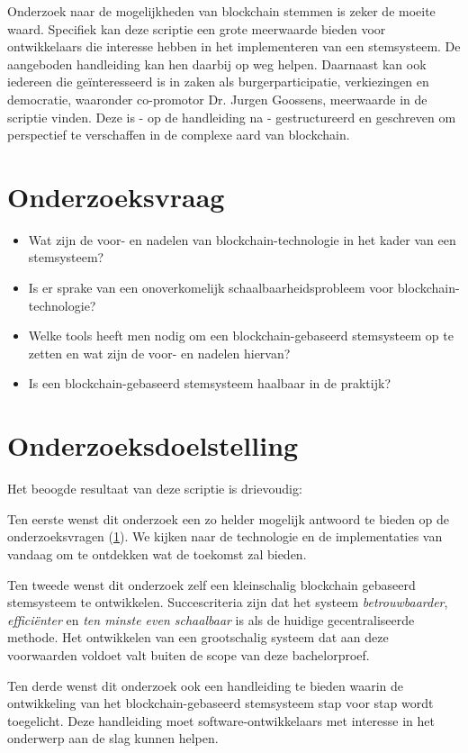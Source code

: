 Onderzoek naar de mogelijkheden van blockchain stemmen is zeker de moeite waard. Specifiek kan deze scriptie een grote meerwaarde bieden voor ontwikkelaars die interesse hebben in het implementeren van een stemsysteem. De aangeboden handleiding kan hen daarbij op weg helpen. Daarnaast kan ook iedereen die geïnteresseerd is in zaken als burgerparticipatie, verkiezingen en democratie, waaronder co-promotor Dr. Jurgen Goossens, meerwaarde in de scriptie vinden. Deze is - op de handleiding na - gestructureerd en geschreven om perspectief te verschaffen in de complexe aard van blockchain.
\section{Onderzoeksvraag}
\label{sec:onderzoeksvraag}
\begin{itemize}
	\item Wat zijn de voor- en nadelen van blockchain-technologie in het kader van een stemsysteem?
	\item Is er sprake van een onoverkomelijk schaalbaarheidsprobleem voor blockchain-technologie?
	\item Welke tools heeft men nodig om een blockchain-gebaseerd stemsysteem op te zetten en wat zijn de voor- en nadelen hiervan?
	\item Is een blockchain-gebaseerd stemsysteem haalbaar in de praktijk?
\end{itemize}
\section{Onderzoeksdoelstelling}
\label{sec:onderzoeksdoelstelling}
Het beoogde resultaat van deze scriptie is drievoudig:

Ten eerste wenst dit onderzoek een zo helder mogelijk antwoord te bieden op de onderzoeksvragen (\ref{sec:onderzoeksvraag}). We kijken naar de technologie en de implementaties van vandaag om te ontdekken wat de toekomst zal bieden.

Ten tweede wenst dit onderzoek zelf een kleinschalig blockchain gebaseerd stemsysteem te ontwikkelen. Succescriteria zijn dat het systeem \textit{betrouwbaarder}, \textit{efficiënter} en \textit{ten minste even schaalbaar} is als de huidige gecentraliseerde methode. Het ontwikkelen van een grootschalig systeem dat aan deze voorwaarden voldoet valt buiten de scope van deze bachelorproef.

Ten derde wenst dit onderzoek ook een handleiding te bieden waarin de ontwikkeling van het blockchain-gebaseerd stemsysteem stap voor stap wordt toegelicht. Deze handleiding moet software-ontwikkelaars met interesse  in het onderwerp aan de slag kunnen helpen.
